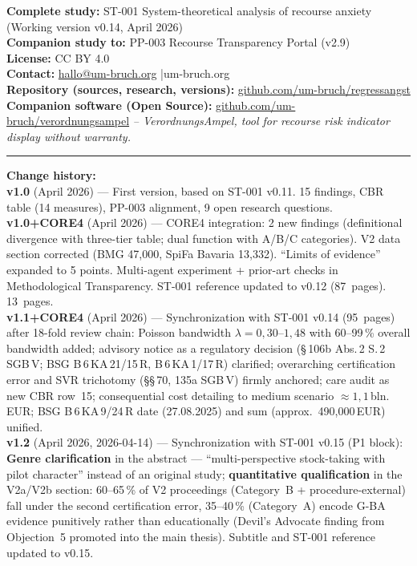 \documentclass{umbruch-position}
\begin{document}
\vspace{2mm}
\noindent\textbf{Complete study:} ST-001 System-theoretical analysis of recourse anxiety (Working version v0.14, April 2026)\\
\textbf{Companion study to:} PP-003 Recourse Transparency Portal (v2.9)\\
\textbf{License:} CC BY 4.0\\
\textbf{Contact:} \href{mailto:hallo@um-bruch.org}{hallo@um-bruch.org} \quad|\quad um-bruch.org\\
\textbf{Repository (sources, research, versions):} \href{https://github.com/um-bruch/regressangst}{github.com/um-bruch/regressangst}\\
\textbf{Companion software (Open Source):} \href{https://github.com/um-bruch/verordnungsampel}{github.com/um-bruch/verordnungsampel} \textit{-- VerordnungsAmpel, tool for recourse risk indicator display without warranty.}

\vspace{4mm}
\noindent\rule{\textwidth}{0.4pt}

\vspace{2mm}
\noindent\textbf{Change history:}\\
\textbf{v1.0} (April 2026) --- First version, based on ST-001 v0.11. 15 findings, CBR table (14 measures), PP-003 alignment, 9 open research questions.\\
\textbf{v1.0+CORE4} (April 2026) --- CORE4 integration: 2 new findings (definitional divergence with three-tier table; dual function with A/B/C categories). V2 data section corrected (BMG 47,000, SpiFa Bavaria 13,332). ``Limits of evidence'' expanded to 5 points. Multi-agent experiment + prior-art checks in Methodological Transparency. ST-001 reference updated to v0.12 (87~pages). 13~pages.\\
\textbf{v1.1+CORE4} (April 2026) --- Synchronization with ST-001 v0.14 (95~pages) after 18-fold review chain: Poisson bandwidth $\lambda = 0{,}30$--$1{,}48$ with 60--99\,\% overall bandwidth added; advisory notice as a regulatory decision (\S\,106b Abs.\,2 S.\,2 SGB\,V; BSG B\,6\,KA\,21/15\,R, B\,6\,KA\,1/17\,R) clarified; overarching certification error and SVR trichotomy (\S\S\,70, 135a SGB\,V) firmly anchored; care audit as new CBR row~15; consequential cost detailing to medium scenario $\approx 1{,}1$\,bln.\,EUR; BSG B\,6\,KA\,9/24\,R date (27.08.2025) and sum (approx.\ 490,000\,EUR) unified.\\
\textbf{v1.2} (April 2026, 2026-04-14) --- Synchronization with ST-001 v0.15 (P1 block): \textbf{Genre clarification} in the abstract --- ``multi-perspective stock-taking with pilot character'' instead of an original study; \textbf{quantitative qualification} in the V2a/V2b section: 60--65\,\% of V2 proceedings (Category~B + procedure-external) fall under the second certification error, 35--40\,\% (Category~A) encode G-BA evidence punitively rather than educationally (Devil's Advocate finding from Objection~5 promoted into the main thesis). Subtitle and ST-001 reference updated to v0.15.
\end{document}
